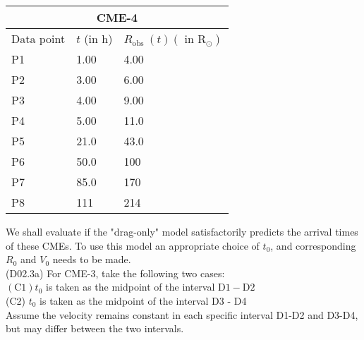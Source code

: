 \documentclass[10pt]{article}
\begin{document}
    \begin{center}
    \begin{tabular}{|l|l|l|}
    \hline
    \multicolumn{3}{|c|}{CME-4} \\
    \hline
    Data point & $t$ (in h) & $R_{\text {obs }}(t)\left(\right.$ in $\left.\mathrm{R}_{\odot}\right)$ \\
    \hline
    P1 & 1.00 & 4.00 \\
    \hline
    P2 & 3.00 & 6.00 \\
    \hline
    P3 & 4.00 & 9.00 \\
    \hline
    P4 & 5.00 & 11.0 \\
    \hline
    P5 & 21.0 & 43.0 \\
    \hline
    P6 & 50.0 & 100 \\
    \hline
    P7 & 85.0 & 170 \\
    \hline
    P8 & 111 & 214 \\
    \hline
    \end{tabular}
    \end{center}
    
    We shall evaluate if the "drag-only" model satisfactorily predicts the arrival times of these CMEs. To use this model an appropriate choice of $t_{0}$, and corresponding $R_{0}$ and $V_{0}$ needs to be made.\\
    (D02.3a) For CME-3, take the following two cases:\\
    $(\mathrm{C} 1) t_{0}$ is taken as the midpoint of the interval $\mathrm{D} 1-\mathrm{D} 2$\\
    (C2) $t_{0}$ is taken as the midpoint of the interval D3 - D4\\
    Assume the velocity remains constant in each specific interval D1-D2 and D3-D4, but may differ between the two intervals.
    
\end{document}
